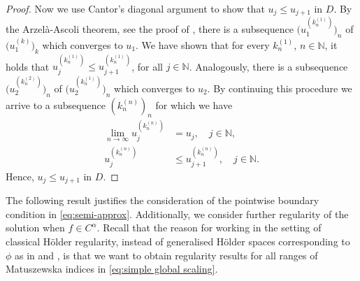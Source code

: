 \documentclass[12pt,a4paper,onecolumn]{amsart}
\theoremstyle{definition}
\newcommand{\N}{\mathbb{N}}
\newcommand{\1}{\mathbf 1}
\numberwithin{equation}{section}
\begin{document}
\begin{proof}
	Now we use Cantor's diagonal argument to show that $u_j\le u_{j+1}$ in $D$. By the Arzel\`{a}-Ascoli theorem, see the proof of \cite[Theorem 5.10]{Bio23}, there is a subsequence $\big(u_{1}^{(k_n^{(1)})}\big)_n$ of $\big(u_{1}^{(k)}\big)_k$ which converges to $u_1$. We have shown that for every $k_n^{(1)}$, $n\in \N$, it holds that $u_{j}^{(k_n^{(1)})}\le u_{j+1}^{(k_n^{(1)})}$, for all $j\in \N$. Analogously, there is a subsequence $\big(u_{2}^{(k_n^{(2)})}\big)_n$ of $\big(u_{2}^{(k_n^{(1)})}\big)_n$ which converges to $u_2$. By continuing this procedure we arrive to a subsequence $(k_n^{(n)})_{n}$ for which we have
	\begin{align*}
		\lim_{n\to\infty} u_{j}^{(k_n^{(n)})}&=u_j,\quad j\in\N,\\
		u_{j}^{(k_n^{(n)})}&\le u_{j+1}^{(k_n^{(n)})},\quad j\in \N.
	\end{align*}
	Hence, $u_j\le u_{j+1}$ in $D$.
\end{proof}

 The following result justifies the consideration of the pointwise boundary condition in \eqref{eq:semi-approx}. Additionally, we consider further regularity of the solution when $f\in C^\alpha$. Recall that the reason for working in the setting of classical H\"older regularity, instead of generalised H\"older spaces corresponding to $\phi$ as in \cite{BaeKassmann} and \cite{KimLee}, is that we want to obtain regularity results for all ranges of Matuszewska indices in \eqref{eq:simple global scaling}.
\end{document}
